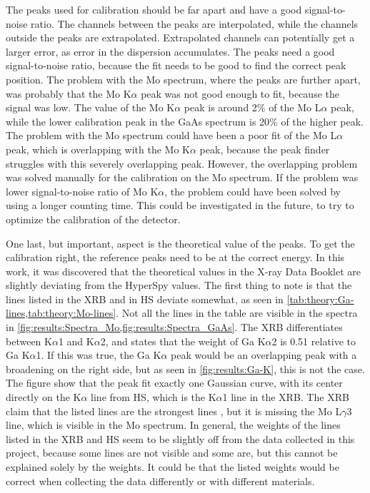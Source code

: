 The peaks used for calibration should be far apart and have a good signal-to-noise ratio.
The channels between the peaks are interpolated, while the channels outside the peaks are extrapolated.
Extrapolated channels can potentially get a larger error, as error in the dispersion accumulates.
The peaks need a good signal-to-noise ratio, because the fit needs to be good to find the correct peak position.
The problem with the Mo spectrum, where the peaks are further apart, was probably that the Mo K$\alpha$ peak was not good enough to fit, because the signal was low.
The value of the Mo K$\alpha$ peak is around 2\% of the Mo L$\alpha$ peak, while the lower calibration peak in the GaAs spectrum is 20\% of the higher peak.
The problem with the Mo spectrum could have been a poor fit of the Mo L$\alpha$ peak, which is overlapping with the Mo K$\alpha$ peak, because the peak finder struggles with this severely overlapping peak.
However, the overlapping problem was solved manually for the calibration on the Mo spectrum.
If the problem was lower signal-to-noise ratio of Mo K$\alpha$, the problem could have been solved by using a longer counting time.
This could be investigated in the future, to try to optimize the calibration of the detector.


One last, but important, aspect is the theoretical value of the peaks.
To get the calibration right, the reference peaks need to be at the correct energy.
In this work, it was discovered that the theoretical values in the X-ray Data Booklet are slightly deviating from the HyperSpy values.
The first thing to note is that the lines listed in the XRB and in HS deviate somewhat, as seen in \cref{tab:theory:Ga-lines,tab:theory:Mo-lines}.
Not all the lines in the table are visible in the spectra in \cref{fig:results:Spectra_Mo,fig:results:Spectra_GaAs}.
The XRB differentiates between K$\alpha$1 and K$\alpha$2, and states that the weight of Ga K$\alpha$2 is 0.51 relative to Ga K$\alpha$1.
If this was true, the Ga K$\alpha$ peak would be an overlapping peak with a broadening on the right side, but as seen in \cref{fig:results:Ga-K}, this is not the case.
The figure show that the peak fit exactly one Gaussian curve, with its center directly on the K$\alpha$ line from HS, which is the K$\alpha$1 line in the XRB.
The XRB claim that the listed lines are the strongest lines \cite[P. 33, Sec. 1.2]{thompson_x-ray_2004}, but it is missing the Mo L$\gamma$3 line, which is visible in the Mo spectrum.
In general, the weights of the lines listed in the XRB and HS seem to be slightly off from the data collected in this project, because some lines are not visible and some are, but this cannot be explained solely by the weights.
It could be that the listed weights would be correct when collecting the data differently or with different materials.


